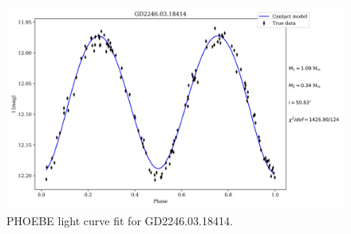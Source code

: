 \documentclass{pracalicmgr}
\begin{document}
\begin{appendices}
\begin{figure}[H]
    \centering
    \includegraphics[width=\textwidth]{plots/modeling_phoebe_contact_GD2246.03.18414.jpg}
    \caption{PHOEBE light curve fit for GD2246.03.18414. }
    \end{figure}
\end{appendices}
\end{document}
